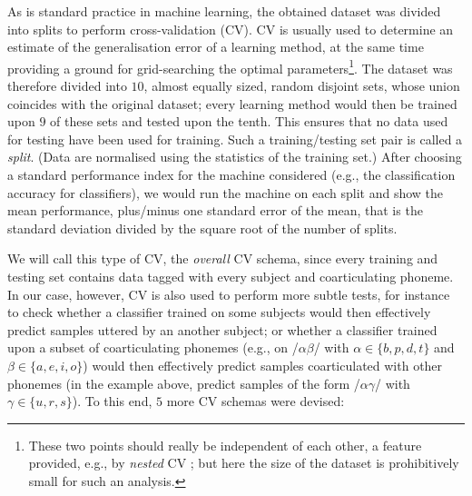 As is standard practice in machine learning, the obtained dataset was divided into
splits to perform cross-validation (CV). CV \cite{stat} is usually used
to determine an estimate of the generalisation error of a learning method, at the
same time providing a ground for grid-searching the optimal parameters\footnote{These
two points should really be independent of each other, a feature provided, e.g., by
\emph{nested} CV \cite{nestedCV}; but here the size of the dataset is
prohibitively small for such an analysis.}. The dataset was therefore divided into
$10$, almost equally sized, random disjoint sets,
whose union coincides with the original dataset; every
learning method would then be trained upon $9$ of these sets and tested upon the
tenth. This ensures that no data used for testing have been used for training. Such a
training/testing set pair is called a \emph{split}. (Data are normalised using the
statistics of the training set.) After choosing a standard performance index for the machine
considered (e.g., the classification accuracy for classifiers), we would run the machine
on each split and show the mean performance, plus/minus one standard error of the mean,
that is the standard deviation divided by the square root of the number of splits.

We will call this type of CV, the \emph{overall} CV schema,
since every training and testing set contains data tagged with every subject and
coarticulating phoneme. In our case, however, CV is also used to perform more subtle
tests, for instance to check whether a classifier trained on some subjects would
then effectively predict samples uttered by an another subject; or whether a classifier
trained upon a subset of coarticulating phonemes (e.g., on /$\alpha\beta$/ with
$\alpha \in \{b,p,d,t\}$ and $\beta \in \{a,e,i,o\}$) would then effectively predict samples
coarticulated with other phonemes (in the example above, predict samples of the form
/$\alpha\gamma$/ with $\gamma \in \{u,r,s\}$). To this end, $5$ more CV schemas were devised:

